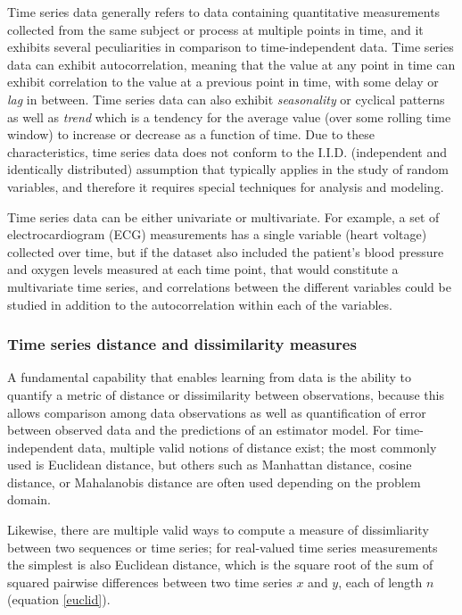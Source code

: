 \documentclass[12pt, letterpaper]{article}
\begin{document}
Time series data generally refers to data containing quantitative measurements
collected from the same subject or process at multiple points in time, and it
exhibits several peculiarities in comparison to time-independent data.  Time
series data can exhibit autocorrelation, meaning that the value at any point in
time can exhibit correlation to the value at a previous point in time, with some
delay or \emph{lag} in between. Time series data can also exhibit
\emph{seasonality} or cyclical patterns as well as \emph{trend} which is a
tendency for the average value (over some rolling time window) to increase or
decrease as a function of time. Due to these characteristics, time series data
does not conform to the I.I.D. (independent and identically distributed)
assumption that typically applies in the study of random variables, and
therefore it requires special techniques for analysis and modeling.

Time series data can be either univariate or multivariate. For example, a set of
electrocardiogram (ECG) measurements has a single variable (heart voltage)
collected over time, but if the dataset also included the patient's blood
pressure and oxygen levels measured at each time point, that would constitute a
multivariate time series, and correlations between the different variables could
be studied in addition to the autocorrelation within each of the variables.

\subsubsection{Time series distance and dissimilarity measures}

A fundamental capability that enables learning from data is the ability to
quantify a metric of distance or dissimilarity between observations, because
this allows comparison among data observations as well as quantification of
error between observed data and the predictions of an estimator model. For
time-independent data, multiple valid notions of distance exist; the most
commonly used is Euclidean distance, but others such as Manhattan distance,
cosine distance, or Mahalanobis distance are often used depending on the problem
domain.

Likewise, there are multiple valid ways to compute a measure of dissimliarity
between two sequences or time series; for real-valued time series measurements
the simplest is also Euclidean distance, which is the square root of the sum of
squared pairwise differences between two time series $x$ and $y$, each of length
$n$ (equation \ref{euclid}).
\end{document}
